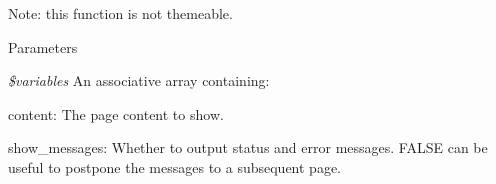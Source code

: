Note: this function is not themeable.


\begin{DoxyParams}{Parameters}
\item[{\em \$variables}]An associative array containing:
\begin{DoxyItemize}
\item content: The page content to show.
\item show\_\-messages: Whether to output status and error messages. FALSE can be useful to postpone the messages to a subsequent page. 
\end{DoxyItemize}\end{DoxyParams}
